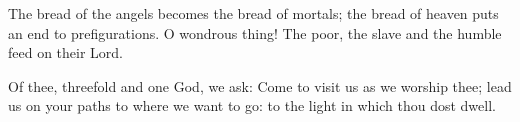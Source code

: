 \begin{otherlanguage}{english}The bread of the angels
becomes the bread of mortals;
the bread of heaven
puts an end to prefigurations.
O wondrous thing!
The poor, the slave and the humble
feed on their Lord.

Of thee, threefold and
one God, we ask:
Come to visit us
as we worship thee;
lead us on your paths
to where we want to go:
to the light in which thou dost dwell.\end{otherlanguage}